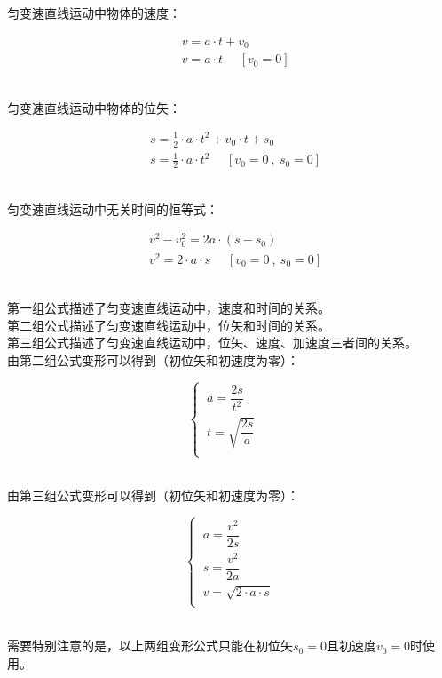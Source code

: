 \documentclass[UTF8]{ctexart}
\begin{document}
    匀变速直线运动中物体的速度：
    \begin{large}
        \begin{align*}
            &v=a\cdot t+v_0\\[3mm]
            &v=a\cdot t~~~~~~[v_0=0]
        \end{align*}
    \end{large}\\
    匀变速直线运动中物体的位矢：
    \begin{large}
        \begin{align*}
            &s=\frac{1}{2}\cdot a\cdot t^2+v_0\cdot t+s_0\\[3mm]
            &s=\frac{1}{2}\cdot a\cdot t^2~~~~~~[v_0=0~,~s_0=0]
        \end{align*}
    \end{large}\\
    匀变速直线运动中无关时间的恒等式：
    \begin{large}
        \begin{align*}
            &v^2-v_0^2=2a\cdot\left(s-s_0\right)\\[3mm]
            &v^2=2\cdot a\cdot s~~~~~~[v_0=0~,~s_0=0]
        \end{align*}
    \end{large}\\
    第一组公式描述了匀变速直线运动中，速度和时间的关系。\\[3mm]
    第二组公式描述了匀变速直线运动中，位矢和时间的关系。\\[3mm]
    第三组公式描述了匀变速直线运动中，位矢、速度、加速度三者间的关系。\\[3mm]
    由第二组公式变形可以得到（初位矢和初速度为零）：\vspace{3pt}
    \begin{large}
        \begin{equation*}
            \begin{cases}
                ~a=\dfrac{2s}{t^2}\\[5mm]
                ~t=\sqrt{\dfrac{2s}{a}}\\[1mm]
            \end{cases}~~~~~
        \end{equation*}
    \end{large}\\
    由第三组公式变形可以得到（初位矢和初速度为零）：\vspace{3pt}
    \begin{large}
        \begin{equation*}
            \begin{cases}
                ~a=\dfrac{v^2}{2s}\\[5mm]
                ~s=\dfrac{v^2}{2a}\\[5mm]
                ~v=\sqrt{2\cdot a\cdot s}\\[1mm]
            \end{cases}
        \end{equation*}
    \end{large}\\
    需要特别注意的是，以上两组变形公式只能在初位矢$s_0=0$且初速度$v_0=0$时使用。
\end{document}
